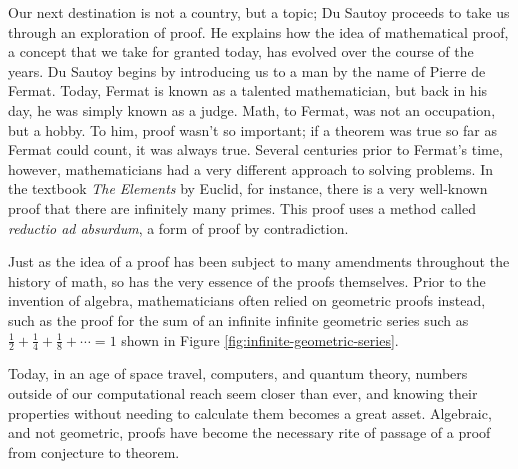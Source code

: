 \documentclass{mathbook}
\begin{document}
    Our next destination is not a country, but a topic; Du Sautoy proceeds to take us through an exploration of proof. He explains how the idea of mathematical proof, a concept that we take for granted today, has evolved over the course of the years. Du Sautoy begins by introducing us to a man by the name of Pierre de Fermat. Today, Fermat is known as a talented mathematician, but back in his day, he was simply known as a judge. Math, to Fermat, was not an occupation, but a hobby. To him, proof wasn't so important; if a theorem was true so far as Fermat could count, it was always true. Several centuries prior to Fermat's time, however, mathematicians had a very different approach to solving problems. In the textbook \emph{The Elements} by Euclid, for instance, there is a very well-known proof that there are infinitely many primes. This proof uses a method called \emph{reductio ad absurdum}, a form of proof by contradiction. \par
    
    Just as the idea of a proof has been subject to many amendments throughout the history of math, so has the very essence of the proofs themselves. Prior to the invention of algebra, mathematicians often relied on geometric proofs instead, such as the proof for the sum of an infinite infinite geometric series such as \(\frac{1}{2} + \frac{1}{4} + \frac{1}{8} + \cdots = 1\) shown in Figure \ref{fig:infinite-geometric-series}. \par
    
    Today, in an age of space travel, computers, and quantum theory, numbers outside of our computational reach seem closer than ever, and knowing their properties without needing to calculate them becomes a great asset. Algebraic, and not geometric, proofs have become the necessary rite of passage of a proof from conjecture to theorem.\par
\end{document}
